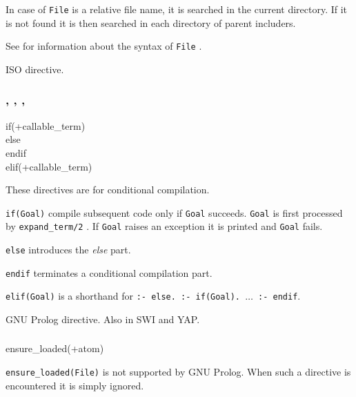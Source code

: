 In case of \texttt{File} is a relative file name, it is searched in the
current directory. If it is not found it is then searched in each directory
of parent includers.


See  for information about the syntax of
\texttt{File} .

\Portability

ISO directive.

\subsubsection{, , ,  }

\begin{TemplatesOneCol}
if(+callable\_term) \\
else\\
endif\\
elif(+callable\_term)

\end{TemplatesOneCol}

\Description

These directives are for conditional compilation.

\texttt{if(Goal)} compile subsequent code only if \texttt{Goal}
succeeds. \texttt{Goal} is first processed by \texttt{expand\_term/2}
.  If \texttt{Goal} raises an exception it is printed
and \texttt{Goal} fails.

\texttt{else} introduces the \textit{else} part.

\texttt{endif} terminates a conditional compilation part.

\texttt{elif(Goal)} is a shorthand for \texttt{:- else. :- if(Goal). $\ldots$ :- endif}.

\Portability

GNU Prolog directive. Also in SWI and YAP.


\subsubsection{}

\begin{TemplatesOneCol}
ensure\_loaded(+atom)

\end{TemplatesOneCol}

\Description

\texttt{ensure\_loaded(File)} is not supported by GNU Prolog. When such a
directive is encountered it is simply ignored.

